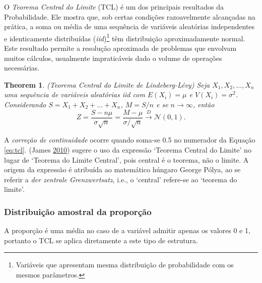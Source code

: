 \documentclass[
]{book}
\newtheorem{theorem}{Theorem}[chapter]
\theoremstyle{definition}
\theoremstyle{definition}
\theoremstyle{definition}
\theoremstyle{remark}
\begin{document}
O \emph{Teorema Central do Limite} (TCL) é um dos principais resultados da Probabilidade. Ele mostra que, sob certas condições razoavelmente alcançadas na prática, a soma ou média de uma sequência de variáveis aleatórias independentes e identicamente distribuídas (\emph{iid})\footnote{Variáveis que apresentam mesma distribuição de probabilidade com os mesmos parâmetros.} têm distribuição aproximadamente normal. Este resultado permite a resolução aproximada de problemas que envolvam muitos cálculos, usualmente impraticáveis dado o volume de operações necessárias.

\begin{theorem}
\protect\hypertarget{thm:tcl}{}{\label{thm:tcl} }(Teorema Central do Limite de Lindeberg-Lévy) Seja \(X_{1}, X_{2}, \ldots, X_{n}\) uma sequência de variáveis aleatórias iid com \(E(X_{i}) = \mu\) e \(V(X_{i}) = \sigma^2\). Considerando \(S=X_{1}+X_{2}+\ldots+X_{n}\), \(M=S/n\) e se \(n \longrightarrow \infty\), então
\begin{equation}
Z = \frac{S - n\mu}{\sigma \sqrt{n}} = \dfrac{M - \mu}{\sigma / \sqrt{n}} \xrightarrow{D} \mathcal{N}(0,1).
\label{eq:tcl}
\end{equation}
\end{theorem}

A \emph{correção de continuidade} ocorre quando soma-se 0.5 no numerador da Equação \eqref{eq:tcl}. (James \protect\hyperlink{ref-james2010probabilidade}{2010}) sugere o uso da expressão `Teorema Central do Limite' no lugar de `Teorema do Limite Central', pois central é o teorema, não o limite. A origem da expressão é atribuída ao matemático húngaro George Pólya, ao se referir a \emph{der zentrale Grenzwertsatz}, i.e., o `central' refere-se ao `teorema do limite'.

\hypertarget{distribuiuxe7uxe3o-amostral-da-proporuxe7uxe3o}{%
\subsubsection*{Distribuição amostral da proporção}\label{distribuiuxe7uxe3o-amostral-da-proporuxe7uxe3o}}

A proporção é uma média no caso de a variável admitir apenas os valores 0 e 1, portanto o TCL se aplica diretamente a este tipo de estrutura.
\end{document}
